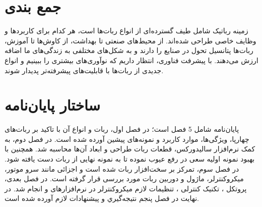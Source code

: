 \section{جمع بندی}
زمینه رباتیک شامل طیف گسترده‌ای از انواع ربات‌ها است، هر کدام برای کاربردها و وظایف خاصی طراحی شده‌اند. از محیط‌های صنعتی تا بهداشت، از کاوش‌ها تا آموزش، ربات‌ها پتانسیل تحول در صنایع را دارند و به شکل‌های مختلفی به زندگی‌های ما اضافه ارزش می‌دهند. با پیشرفت فناوری، انتظار داریم که نوآوری‌های بیشتری را ببینیم و انواع جدیدی از ربات‌ها با قابلیت‌های پیشرفته‌تر پدیدار شوند.
\newpage
\section{ساختار پایان‌نامه}
پایان‌نامه شامل 5 فصل است؛ در فصل اول، ربات و انواع آن با تاکید بر ربات‌های چهارپا، ویژگی‌ها، موارد کاربرد و نمونه‌های پیشین آورده شده است. در فصل دوم، به کمک نرم‌افزار سالیدورکس، قطعات ربات طراحی و ابعاد آن‌ها محاسبه شد. همچنین با بهبود نمونه اولیه سعی در رفع عیوب نموده تا به نمونه نهایی از ربات دست یافته شود. در فصل سوم، تمرکز بر سخت‌افزار ربات شده است و اجزائی مانند سرو موتور، میکروکنترلر، ماژول  و دوربین ربات مورد بررسی قرار گرفته است. در فصل بعدی، پروتکل ، تکنیک کنترلی ، تنظیمات لازم میکروکنترلر در نرم‌افزارهای  و  انجام شد. در نهایت در فصل پنجم نتیجه‌گیري و پیشنهادات لازم آورده شده است.